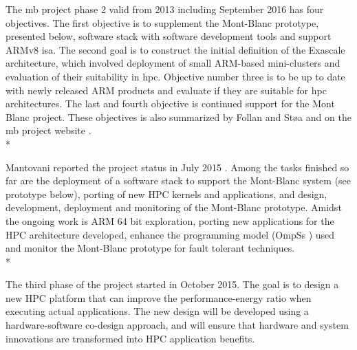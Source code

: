 The \gls{mb} project phase 2 valid from 2013 including September 2016 has four objectives. The first objective is to supplement the Mont-Blanc prototype, presented below, software stack with software development tools and support ARMv8 \gls{isa}. The second goal is to construct the initial definition of the Exascale architecture, which involved deployment of small ARM-based mini-clusters and evaluation of their suitability in \gls{hpc}. Objective number three is to be up to date with newly released ARM products and evaluate if they are suitable for \gls{hpc} architectures. The last and fourth objective is continued support for the Mont Blanc project. These objectives is also summarized by Follan and Støa \cite{mt:T&S} and on the \gls{mb} project website \cite{MB}.\\*

Mantovani reported the project status in July 2015 \cite{p:MB-15}. Among the tasks finished so far are the deployment of a software stack to support the Mont-Blanc system (see prototype below), porting of new HPC kernels and applications, and design, development, deployment and monitoring of the Mont-Blanc prototype. Amidst the ongoing work is ARM 64 bit exploration, porting new applications for the HPC architecture developed, enhance the programming model (OmpSs \cite{OMPSS}) used and monitor the Mont-Blanc prototype for fault tolerant techniques. \\*

The third phase of the project started in October 2015. The goal is to design a new HPC platform that can improve the performance-energy ratio when executing actual applications. The new design will be developed using a hardware-software co-design \cite{a:MG1997} approach, and will ensure that hardware and system innovations are transformed into HPC application benefits.

